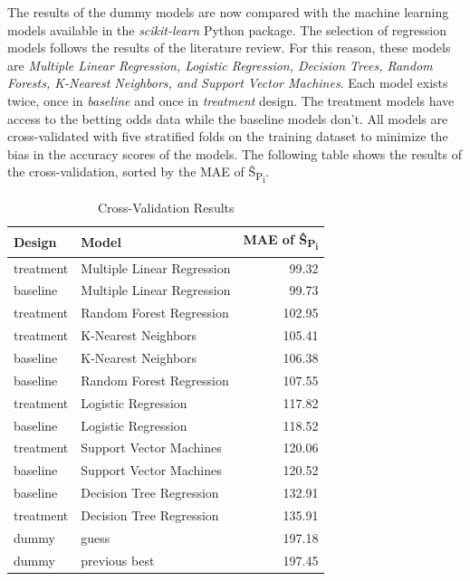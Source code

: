 The results of the dummy models are now compared with the machine learning models available in the \emph{scikit-learn} Python package. The selection of regression models follows the results of the literature review. For this reason, these models are \emph{Multiple Linear Regression, Logistic Regression, Decision Trees, Random Forests, K-Nearest Neighbors, and Support Vector Machines}. Each model exists twice, once in \emph{baseline} and once in \emph{treatment} design. The treatment models have access to the betting odds data while the baseline models don't. All models are cross-validated with five stratified folds on the training dataset to minimize the bias in the accuracy scores of the models. The following table shows the results of the cross-validation, sorted by the MAE of \^{S}\textsubscript{P\textsubscript{i}}.

\begin{table}[H]
    \renewcommand{\arraystretch}{1.0}
    \setlength{\tabcolsep}{15pt}
    \centering
    \caption{Cross-Validation Results}
    \label{tab:cv_results}
    \begin{tabularx}{\textwidth}{lXr}
    \toprule
    \textbf{Design} & \textbf{Model} & \textbf{MAE of \^{S}\textsubscript{P\textsubscript{i}}} \\ \midrule
    treatment   & Multiple Linear Regression    & 99.32 \\
    baseline    & Multiple Linear Regression    & 99.73 \\
    treatment   & Random Forest Regression      & 102.95 \\
    treatment   & K-Nearest Neighbors           & 105.41 \\
    baseline    & K-Nearest Neighbors           & 106.38 \\
    baseline    & Random Forest Regression      & 107.55 \\
    treatment   & Logistic Regression           & 117.82 \\
    baseline    & Logistic Regression           & 118.52 \\
    treatment   & Support Vector Machines       & 120.06 \\
    baseline    & Support Vector Machines       & 120.52 \\
    baseline    & Decision Tree Regression      & 132.91 \\
    treatment   & Decision Tree Regression      & 135.91 \\
    dummy       & guess                         & 197.18 \\
    dummy       & previous best                 & 197.45 \\ \bottomrule
    \end{tabularx}
\end{table}

